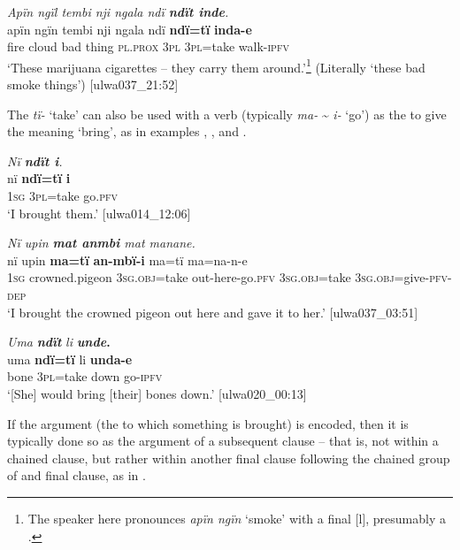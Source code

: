 \ea%
    \label{ex:complex:106}
          \textit{Apïn ngïl tembi nji ngala ndï \textbf{ndït inde}.}\\
\gll apïn  ngïn  tembi  nji    ngala    ndï  \textbf{ndï=tï}    \textbf{inda-e}\\
    fire    cloud  bad    thing  \textsc{pl.prox}  3\textsc{pl}  3\textsc{pl}=take  walk-\textsc{ipfv}\\
\glt `These marijuana cigarettes -- they carry them around.’\footnote{The speaker here pronounces \textit{apïn ngïn} `smoke’ with a final [l], presumably a .} (Literally ‘these bad smoke things’) [ulwa037\_21:52]
\z

The  \textit{tï-} ‘take’ can also be used with a  verb (typically \linebreak \textit{ma-} {\textasciitilde} \textit{i-} ‘go’) as the  to give the meaning ‘bring’, as in examples , , and .

\ea%
    \label{ex:complex:107}
          \textit{Nï \textbf{ndït i}.}\\
\gll nï  \textbf{ndï=tï}  \textbf{i}\\
    1\textsc{sg}  \textsc{3pl=}take  go.\textsc{pfv}\\
\glt `I brought them.’ [ulwa014\_12:06]
\z

\ea%
    \label{ex:complex:108}
          \textit{Nï upin \textbf{mat anmbi} mat manane.}\\
\gll    nï    upin  \textbf{ma=tï}      \textbf{an-mbï-i}      ma=tï ma=na-n-e\\
    1\textsc{sg}  crowned.pigeon  3\textsc{sg.obj}=take  out-here-go.\textsc{pfv}  3\textsc{sg.obj}=take    3\textsc{sg.obj}=give-\textsc{pfv-dep}\\
\glt `I brought the crowned pigeon out here and gave it to her.’ [ulwa037\_03:51]
\z

\ea%
    \label{ex:complex:109}
          \textit{Uma} \textbf{\textit{ndït}} \textit{li} \textbf{\textit{unde}.}\\
\gll uma  \textbf{ndï=tï}    li    \textbf{unda-e}\\
    bone  3\textsc{pl}=take  down  go-\textsc{ipfv}\\
\glt `[She] would bring [their] bones down.’ [ulwa020\_00:13]
\z

If the  argument (the  to which something is brought) is encoded, then it is typically done so as the argument of a subsequent clause -- that is, not within a chained clause, but rather within another final clause following the chained group of  and final clause, as in .

